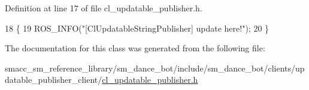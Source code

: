 Definition at line 17 of file cl\+\_\+updatable\+\_\+publisher.\+h.


\begin{DoxyCode}
18     \{
19         ROS\_INFO(\textcolor{stringliteral}{"[ClUpdatableStringPublisher] update here!"});
20     \}
\end{DoxyCode}


The documentation for this class was generated from the following file\+:\begin{DoxyCompactItemize}
\item 
smacc\+\_\+sm\+\_\+reference\+\_\+library/sm\+\_\+dance\+\_\+bot/include/sm\+\_\+dance\+\_\+bot/clients/updatable\+\_\+publisher\+\_\+client/\hyperlink{cl__updatable__publisher_8h}{cl\+\_\+updatable\+\_\+publisher.\+h}\end{DoxyCompactItemize}
